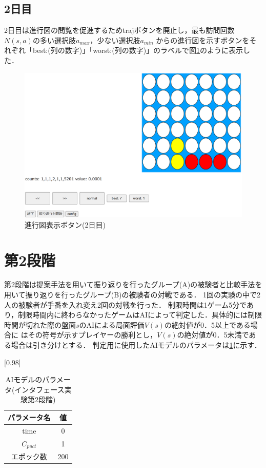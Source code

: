 \subsection{2日目}
2日目は進行図の閲覧を促進するためtrajボタンを廃止し，最も訪問回数$N(s,a)$の多い選択肢$a_{max}$，少ない選択肢$a_{min}$
からの進行図を示すボタンをそれぞれ「best:(列の数字)」「worst:(列の数字)」のラベルで図\ref{fig:best-worst}のように表示した．
\begin{figure}[t]
	\centering
	\includegraphics[width=\linewidth]{./figure/best-worst.png}
	\caption{進行図表示ボタン(2日目)}
	\label{fig:best-worst}
\end{figure}
\section{第2段階}
第2段階は提案手法を用いて振り返りを行ったグループ(A)の被験者と比較手法を用いて振り返りを行ったグループ(B)の被験者の対戦である．
1回の実験の中で2人の被験者が手番を入れ変え2回の対戦を行った．
制限時間は1ゲーム5分であり，制限時間内に終わらなかったゲームはAIによって判定した．具体的には制限時間が切れた際の盤面$s$のAIによる局面評価$V(s)$の絶対値が0．5以上である場合に
はその符号が示すプレイヤーの勝利とし，$V(s)$の絶対値が0．5未満である場合は引き分けとする．
判定用に使用したAIモデルのパラメータは\ref{table:param-judge}に示す．
\begin{table}[H]
	\caption{AIモデルのパラメータ(インタフェース実験第2段階)}
    \label{table:param-judge}
	\centering
	\scalebox{0.98}[0.98]{
		\begin{tabular}{c|c}
			パラメータ名 & 値 \\ \hline
			time    & 0\\ 
			$C_{puct}$    & 1 \\
            エポック数 & 200 \\
		\end{tabular}
	}
	
\end{table}


